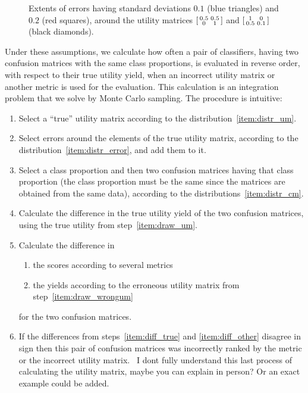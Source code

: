 \documentclass[\ifafour a4paper,12pt,\else a5paper,10pt,\fi%
onecolumn,oneside,article,%
british%
]{memoir}
\theoremstyle{remark}
\theoremstyle{innote}
\newcommand*{\wrench}{{\fontencoding{U}\fontfamily{fontawesomethree}\selectfont\symbol{114}}}
\newcommand{\mynotew}[1]{{\footnotesize\color{notecolour}\wrench\ #1}}
\renewcommand*{\|}[1][]{\nonscript\:#1\vert\nonscript\:\mathopen{}}
\begin{document}
\begin{figure}[t]
{    \caption{Extents of errors having standard deviations $0.1$ ({\color{mypurpleblue}blue triangles}) and $0.2$ ({\color{myred}red squares}), around the utility matrices $\begin{bsmallmatrix} 0.5&0.5\\0&1 \end{bsmallmatrix}$ and $\begin{bsmallmatrix} 1&0\\0.5&0.1 \end{bsmallmatrix}$ (black diamonds).}
    \label{fig:error_distr_um}}
\end{figure}

Under these assumptions, we calculate how often a pair of classifiers, having two confusion matrices with the same class proportions, is evaluated in reverse order, with respect to their true utility yield, when an incorrect utility matrix or another metric is used for the evaluation. This calculation is an integration problem that we solve by Monte Carlo sampling. The procedure is intuitive:
\begin{enumerate}[label=\arabic*.,ref=\arabic*]
\item\label{item:draw_um} Select a \enquote{true} utility matrix according to the distribution~\ref{item:distr_um}.
\item\label{item:draw_wrongum} Select errors around the elements of the true utility matrix, according to the distribution~\ref{item:distr_error}, and add them to it.
\item\label{item:draw_cm} Select a class proportion and then two confusion matrices having that class proportion (the class proportion must be the same since the matrices are obtained from the same data), according to the distributions~\ref{item:distr_cm}.
\item\label{item:diff_true} Calculate the difference in the true utility yield of the two confusion matrices, using the true utility from step~\ref{item:draw_um}.
\item\label{item:diff_other} Calculate the difference in
  \begin{enumerate}[label=\theenumi\alph*.]
  \item the scores according to several metrics
  \item the yields according to the erroneous utility matrix from step~\ref{item:draw_wrongum}
  \end{enumerate}
for the two confusion matrices.
\item If the differences from steps~\ref{item:diff_true} and \ref{item:diff_other} disagree in sign then this pair of confusion matrices was incorrectly ranked by the metric or the incorrect utility matrix. \mynotew{I dont fully understand this last process of calculating the utility matrix, maybe you can explain in person? Or an exact example could be added. }
\end{enumerate}
\end{document}
